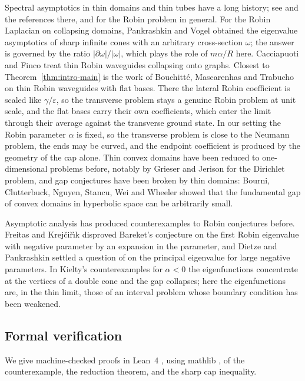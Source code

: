 \documentclass[11pt,a4paper]{article}
\numberwithin{equation}{section}
\theoremstyle{paperplain}
\theoremstyle{remark}
\begin{document}
Spectral asymptotics in thin domains and thin tubes have a long history; see
\cite{HaleRaugel,FriedlanderSolomyak,BorisovFreitas,Grieser} and the
references there, and \cite{BFK} for the Robin problem in general. For the
Robin Laplacian on collapsing domains, Pankrashkin and Vogel \cite{PankrashkinVogel}
obtained the eigenvalue asymptotics of sharp infinite cones with an
arbitrary cross-section $\omega$; the answer is governed by the ratio
$|\partial\omega|/|\omega|$, which plays the role of $m\alpha/R$ here.
Cacciapuoti and Finco \cite{CacciapuotiFinco} treat thin Robin waveguides
collapsing onto graphs. Closest to Theorem~\ref{thm:intro-main} is the work
of Bouchitt\'e, Mascarenhas and Trabucho \cite{BMT} on thin Robin
waveguides with flat bases. There the
lateral Robin coefficient is scaled like $\gamma/\varepsilon$, so the
transverse problem stays a genuine Robin problem at unit scale, and the flat
bases carry their own coefficients, which enter the limit through their
average against the transverse ground state. In our setting the Robin
parameter $\alpha$ is fixed, so the transverse problem is close to the
Neumann problem, the ends may be curved, and the endpoint coefficient is
produced by the geometry of the cap alone. Thin convex domains have been reduced to one-dimensional problems before,
notably by Grieser and Jerison \cite{GrieserJerison} for the Dirichlet
problem, and gap conjectures have been broken by thin domains: Bourni,
Clutterbuck, Nguyen, Stancu, Wei and Wheeler \cite{Bourni} showed that the
fundamental gap of convex domains in hyperbolic space can be arbitrarily
small.

Asymptotic analysis has produced counterexamples to Robin conjectures
before. Freitas and Krej\v{c}i\v{r}\'{\i}k \cite{FreitasKrejcirik} disproved
Bareket's conjecture on the first Robin eigenvalue with negative parameter
by an expansion in the parameter, and Dietze and Pankrashkin
\cite{DietzePankrashkin} settled a question of \cite{BFK} on the principal
eigenvalue for large negative parameters. In Kielty's counterexamples for
$\alpha<0$ \cite{Kielty} the eigenfunctions concentrate at the vertices of a
double cone and the gap collapses; here the eigenfunctions are, in the thin
limit, those of an interval problem whose boundary condition has been
weakened.

\subsection{Formal verification}
We give machine-checked proofs in Lean~4 \cite{Lean4}, using mathlib
\cite{mathlib}, of the counterexample, the reduction theorem, and the sharp
cap inequality.
\end{document}
